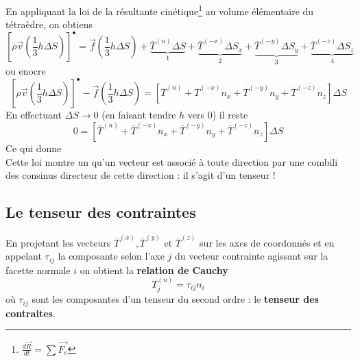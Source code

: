     En appliquant la loi de la résultante cinétique\footnote{$\frac{d\vec{R}}{dt} = \sum \vec{F_e}$} au volume 
    élémentaire du tétraèdre, on obtiens 
    \begin{equation}
    \left[\rho\vec{v}\left(\dfrac{1}{3}h\Delta S\right)\right]^{\bullet} = \vec{f}\left(\dfrac{1}{3}h\Delta S\right) +
    \underbrace{\overline{T}^{(n)}\Delta S}_{1} + \underbrace{\overline{T}^{(-x)}\Delta S_x}_{2} + 
    \underbrace{\overline{T}^{(-y)}\Delta S_y}_{3} + \underbrace{\overline{T}^{(-z)}\Delta S_z}_{4}
    \end{equation}
    ou enocre
    \begin{equation}
    \left[\rho\vec{v}\left(\dfrac{1}{3}h\Delta S\right)\right]^{\bullet} -\vec{f}\left(\dfrac{1}{3}h\Delta S\right)
    = \left[\overline{T}^{(n)}+\overline{T}^{(-x)}n_x + \overline{T}^{(-y)}n_y
    + \overline{T}^{(-z)}n_z\right]\Delta S
    \end{equation}
    En effectuant $\Delta S \rightarrow 0$ (en faisant tendre $h$ vers 0) il reste
    \begin{equation}
    0 = \left[\overline{T}^{(n)}+\overline{T}^{(-x)}n_x +\overline{T}^{(-y)}n_y+\overline{T}^{(-z)}n_z\right]
    \Delta S
    \end{equation}
    Ce qui donne\\
    
    Cette loi montre un qu'un vecteur est associé à toute direction par une combili des consinus directeur de
    cette direction : il s'agit d'un tenseur !
    
    \subsection{Le tenseur des contraintes}
    En projetant les vecteurs $\overline{T}^{(x)}, \overline{T}^{(y)}$ et $\overline{T}^{(z)}$ sur les axes de
    coordonnés et en appelant $\tau_{ij}$ la composante selon l'axe $j$ du vecteur contrainte agissant sur la 
    facette normale $i$ on obtient la \textbf{relation de Cauchy}
    \begin{equation}
    T_j^{(n)} = \tau_{ij}n_i
    \end{equation}
    où $\tau_{ij}$ sont les composantes d'un tenseur du second ordre : le \textbf{tenseur des contraites}.
    
